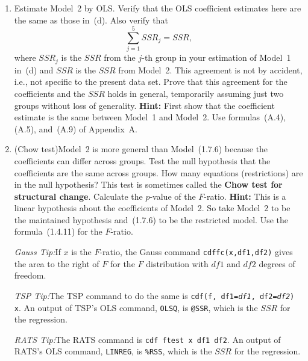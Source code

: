 \begin{problemset}
\begin{enumerate}[label=(\alph*)]
\item Estimate Model~2 by OLS\@. Verify that the OLS coefficient estimates
here are the same as those in~(d). Also verify that
%
\[
\sum_{j=1}^{5} SSR_j = SSR,
\]
%
where $SSR_j$ is the $SSR$ from the $j$-th group in your estimation of
Model~1 in~(d) and $SSR$ is the $SSR$ from Model~2. This agreement is not
by accident, i.e., not specific to the present data set. Prove that this
agreement for the coefficients and the $SSR$ holds in general, temporarily
assuming just two groups without loss of generality. \textbf{Hint:} First
show that the coefficient estimate is the same between Model~1 and Model~2.
Use formulas~(A.4), (A.5), and~(A.9) of Appendix~A.

\item (Chow test)\quad Model~2 is more general than Model~(1.7.6) because
the coefficients can differ across groups. Test the null hypothesis that the
coefficients are the same across groups. How many equations (restrictions)
are in the null hypothesis? This test is sometimes called the \textbf{Chow
test for structural change}. Calculate the $p$-value of the $F$-ratio.
\textbf{Hint:} This is a linear hypothesis about the coefficients of
Model~2. So take Model~2 to be the maintained hypothesis and~(1.7.6) to be
the restricted model. Use the formula~(1.4.11) for the $F$-ratio.

\medskip
\noindent
\textit{Gauss Tip:}\enspace If $x$ is the $F$-ratio, the Gauss command
\texttt{cdffc(x,df1,df2)} gives the area to the right of $F$ for the $F$
distribution with $df1$ and $df2$ degrees of freedom.

\medskip
\noindent
\textit{TSP Tip:}\enspace The TSP command to do the same is
\texttt{cdf(f, df1=\textit{df1}, df2=\textit{df2}) x}. An output of TSP's
OLS command, \texttt{OLSQ}, is \texttt{@SSR}, which is the $SSR$ for the
regression.

\medskip
\noindent
\textit{RATS Tip:}\enspace The RATS command is
\texttt{cdf ftest x df1 df2}. An output of RATS's OLS command,
\texttt{LINREG}, is \texttt{\%RSS}, which is the $SSR$ for the regression.


\end{enumerate}
\end{problemset}
